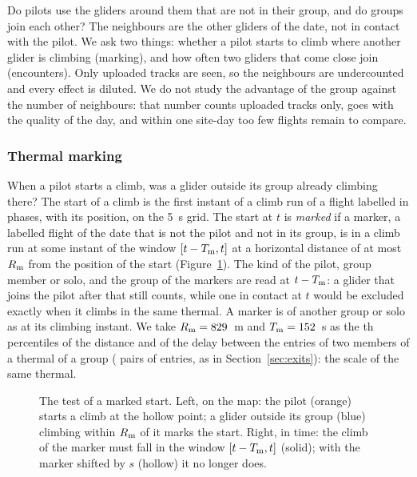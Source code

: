 Do pilots use the gliders around them that are not in their group, and do groups join each other?
The neighbours are the other gliders of the date, not in contact with the pilot. We ask two things:
whether a pilot starts to climb where another glider is climbing (marking), and how often two
gliders that come close join (encounters). Only uploaded tracks are seen, so the neighbours are
undercounted and every effect is diluted. We do not study the advantage of the group against the
number of neighbours: that number counts uploaded tracks only, goes with the quality of the day, and
within one site-day too few flights remain to compare.

\subsubsection{Thermal marking}\label{sec:marking}

When a pilot starts a climb, was a glider outside its group already climbing there? The start of a
climb is the first instant of a climb run of a flight labelled in phases, with its position, on
the 5~s grid. The start at $t$ is \emph{marked} if a marker, a labelled flight of the date that is
not the pilot and not in its group, is in a climb run at some instant of the window
$[t-T_{\rm m},t]$ at a horizontal distance of at most $R_{\rm m}$ from the position of the start
(Figure~\ref{fig:marking-scheme}). The kind of the pilot, group member or solo, and the group of the
markers are read at $t-T_{\rm m}$: a glider that joins the pilot after that still counts, while one
in contact at $t$ would be excluded exactly when it climbs in the same thermal. A marker is of
another group or solo as at its climbing instant. We take $R_{\rm m}=829$~m and
$T_{\rm m}=152$~s as the \StMkPercentile{}th percentiles of the distance and of the delay between
the entries of two members of a thermal of a group (\StMkPairs{} pairs of entries, as in
Section~\ref{sec:exits}): the scale of the same thermal.

\begin{figure}
\centering

\caption{The test of a marked start. Left, on the map: the pilot (orange) starts a climb at the
hollow point; a glider outside its group (blue) climbing within $R_{\rm m}$ of it marks the start.
Right, in time: the climb of the marker must fall in the window $[t-T_{\rm m},t]$ (solid); with the
marker shifted by $s$ (hollow) it no longer does.}
\label{fig:marking-scheme}
\end{figure}


